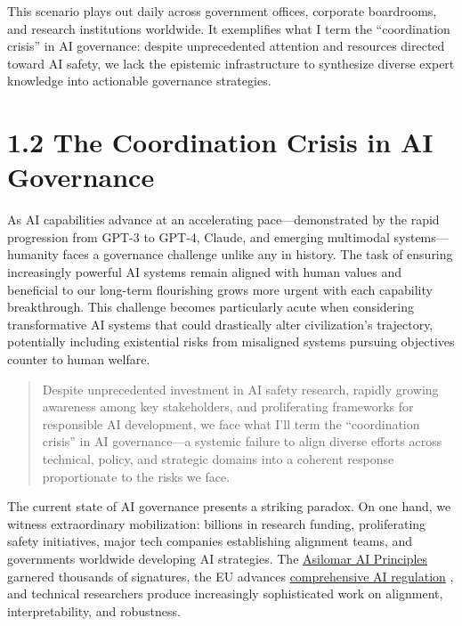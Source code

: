 \documentclass[
  11pt,
  letterpaper,
]{book}
\begin{document}
This scenario plays out daily across government offices, corporate
boardrooms, and research institutions worldwide. It exemplifies what I
term the ``coordination crisis'' in AI governance: despite unprecedented
attention and resources directed toward AI safety, we lack the epistemic
infrastructure to synthesize diverse expert knowledge into actionable
governance strategies.

\section*{1.2 The Coordination Crisis in AI
Governance}\label{sec-coordination-crisis}


\textcite{maslej2025}

\textcite{samborska2025}

As AI capabilities advance at an accelerating pace---demonstrated by the
rapid progression from GPT-3 to GPT-4, Claude, and emerging multimodal
systems---humanity faces a governance challenge unlike any in history.
The task of ensuring increasingly powerful AI systems remain aligned
with human values and beneficial to our long-term flourishing grows more
urgent with each capability breakthrough. This challenge becomes
particularly acute when considering transformative AI systems that could
drastically alter civilization's trajectory, potentially including
existential risks from misaligned systems pursuing objectives counter to
human welfare.

\begin{quote}
Despite unprecedented investment in AI safety research, rapidly growing
awareness among key stakeholders, and proliferating frameworks for
responsible AI development, we face what I'll term the ``coordination
crisis'' in AI governance---a systemic failure to align diverse efforts
across technical, policy, and strategic domains into a coherent response
proportionate to the risks we face.
\end{quote}

The current state of AI governance presents a striking paradox. On one
hand, we witness extraordinary mobilization: billions in research
funding, proliferating safety initiatives, major tech companies
establishing alignment teams, and governments worldwide developing AI
strategies. The
\href{https://futureoflife.org/open-letter/ai-principles/}{Asilomar AI
Principles} garnered thousands of signatures, the EU advances
\href{https://artificialintelligenceact.eu/the-act/}{comprehensive AI
regulation} , and technical researchers produce increasingly
sophisticated work on alignment, interpretability, and robustness.
\end{document}
